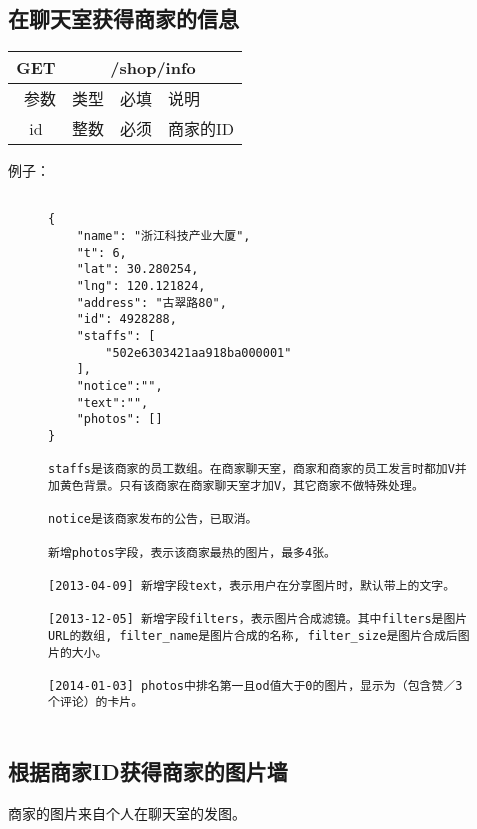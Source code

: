 \documentclass[cs4size]{ctexartutf8}
\begin{document}
\subsection{在聊天室获得商家的信息}

\begin{table}[H]
   \begin{center}
\begin{tabular}{|c|c|c|p{12cm}|}
\hline
GET & \multicolumn{3}{|c|}{/shop/info} \\
\hline\hline
 \  参数  & 类型 & 必填 &  说明  \\
\hline
 id  & 整数 & 必须 & 商家的ID\\
\hline
\end{tabular}
   \end{center}
\end{table}

例子：

\begin{figure}[H]
\begin{verbatim}

{
    "name": "浙江科技产业大厦",
    "t": 6,
    "lat": 30.280254,
    "lng": 120.121824,
    "address": "古翠路80",
    "id": 4928288,
    "staffs": [
        "502e6303421aa918ba000001"
    ],
    "notice":"",
    "text":"",    
    "photos": []
}

staffs是该商家的员工数组。在商家聊天室，商家和商家的员工发言时都加V并加黄色背景。只有该商家在商家聊天室才加V，其它商家不做特殊处理。

notice是该商家发布的公告，已取消。

新增photos字段，表示该商家最热的图片，最多4张。

[2013-04-09] 新增字段text，表示用户在分享图片时，默认带上的文字。

[2013-12-05] 新增字段filters，表示图片合成滤镜。其中filters是图片URL的数组, filter_name是图片合成的名称, filter_size是图片合成后图片的大小。

[2014-01-03] photos中排名第一且od值大于0的图片，显示为（包含赞／3个评论）的卡片。


\end{verbatim}
\end{figure}



\subsection{根据商家ID获得商家的图片墙}
商家的图片来自个人在聊天室的发图。\label{photowall}
\end{document}
